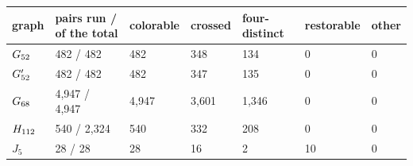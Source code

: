 \begin{tabular}{lllllll}
\toprule
graph & pairs run / of the total & colorable & crossed & four-distinct & restorable & other\\
\midrule
$G_{52}$ & 482 / 482 & 482 & 348 & 134 & 0 & 0\\
$G'_{52}$ & 482 / 482 & 482 & 347 & 135 & 0 & 0\\
$G_{68}$ & 4{,}947 / 4{,}947 & 4{,}947 & 3{,}601 & 1{,}346 & 0 & 0\\
$H_{112}$ & 540 / 2{,}324 & 540 & 332 & 208 & 0 & 0\\
$J_5$ & 28 / 28 & 28 & 16 & 2 & 10 & 0\\
\bottomrule
\end{tabular}
